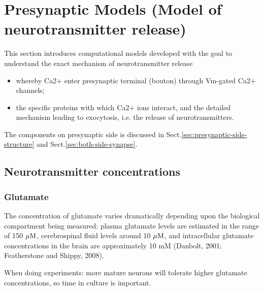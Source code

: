 \chapter{Presynaptic Models (Model of neurotransmitter release)}
\label{chap:Presynaptic-models}



This section introduces computational models developed with the goal to
understand the exact mechanism of neurotransmitter release
\begin{itemize}
  \item  whereby Ca2+ enter presynaptic terminal (bouton) through Vm-gated Ca2+
  channels; 
  
  \item the specific proteins with which Ca2+ ions interact, and the detailed
  mechanism leading to exocytosis, i.e. the release of neurotransmitters.
\end{itemize}

The components on presynaptic side is discussed in
Sect.\ref{sec:presynaptic-side-structure} and Sect.\ref{sec:both-side-synapse}.

\section{Neurotransmitter concentrations}
\label{sec:neurotransmitter-concentration}

\subsection{Glutamate}
\label{sec:Glutamate-concentration}

The concentration of glutamate varies dramatically depending upon the biological
compartment being measured:  plasma glutamate levels are estimated in the range
of 150 ${\mu\text{M}}$, cerebrospinal fluid levels around 10 ${\mu\text{M}}$, and intracellular
glutamate concentrations in the brain are approximately 10 mM (Danbolt, 2001; Featherstone
and Shippy, 2008).  

When doing experiments: more mature neurons will tolerate higher glutamate
concentrations, so time in culture is important. 

